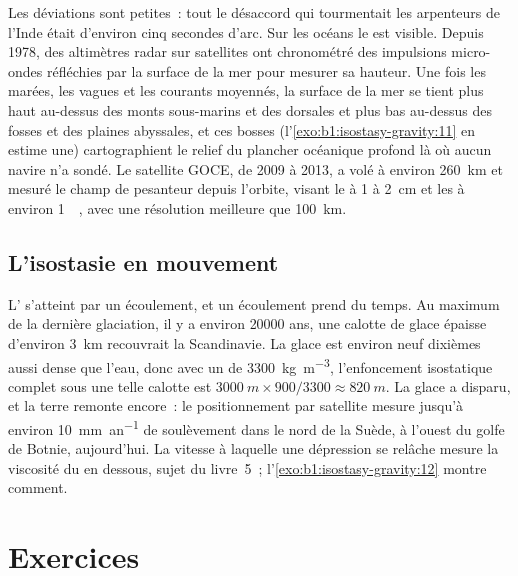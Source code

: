 Les déviations sont petites~: tout le désaccord qui tourmentait les arpenteurs
de l'Inde était d'environ cinq secondes d'arc. Sur les océans le  est visible.
Depuis 1978, des altimètres radar sur satellites ont chronométré des impulsions micro-ondes
réfléchies par la surface de la mer pour mesurer sa hauteur. Une fois les marées, les
vagues et les courants moyennés, la surface de la mer se tient plus haut au-dessus des monts
sous-marins et des dorsales et plus bas au-dessus des fosses et des plaines abyssales, et ces
bosses (l'\cref{exo:b1:isostasy-gravity:11}
en estime une) cartographient le relief du plancher océanique profond là où aucun navire n'a
sondé. Le satellite GOCE, de 2009 à 2013, a volé à environ \qty{260}{km}
et mesuré le champ de pesanteur depuis l'orbite, visant le  à 1 à
\qty{2}{cm} et les  à environ \qty{1}{\milli\gal}, avec une
résolution meilleure que \qty{100}{km}.

\subsection*{L'isostasie en mouvement}

L' s'atteint par un écoulement, et un écoulement prend du temps. Au maximum
de la dernière glaciation, il y a environ \num{20000} ans, une calotte de glace épaisse
d'environ \qty{3}{km} recouvrait la Scandinavie.
La glace est environ neuf dixièmes aussi dense que l'eau, donc avec un  de
\qty{3300}{kg.m^{-3}}, l'enfoncement isostatique complet sous une telle calotte est
$\qty{3000}{m}\times900/3300 \approx \qty{820}{m}$. La glace a disparu, et la
terre remonte encore~: le positionnement par satellite mesure jusqu'à environ
\qty{10}{mm.an^{-1}} de soulèvement dans le nord de la Suède, à l'ouest du golfe de Botnie,
aujourd'hui. La
vitesse à laquelle une dépression se relâche mesure la viscosité du  en dessous,
sujet du livre~5~; l'\cref{exo:b1:isostasy-gravity:12} montre comment.

\section{Exercices}

